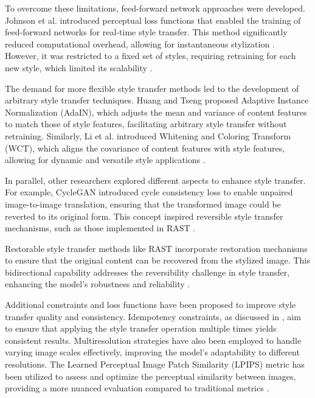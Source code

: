 \documentclass{article}
\begin{document}
To overcome these limitations, feed-forward network approaches were developed. Johnson et al. \cite{Johnson2016} introduced perceptual loss functions that enabled the training of feed-forward networks for real-time style transfer. This method significantly reduced computational overhead, allowing for instantaneous stylization \cite{Johnson2016}. However, it was restricted to a fixed set of styles, requiring retraining for each new style, which limited its scalability \cite{Johnson2016}.

The demand for more flexible style transfer methods led to the development of arbitrary style transfer techniques. Huang and Tseng \cite{Huang2017} proposed Adaptive Instance Normalization (AdaIN), which adjusts the mean and variance of content features to match those of style features, facilitating arbitrary style transfer without retraining. Similarly, Li et al. \cite{Li2017} introduced Whitening and Coloring Transform (WCT), which aligns the covariance of content features with style features, allowing for dynamic and versatile style applications \cite{Huang2017, Li2017}.

In parallel, other researchers explored different aspects to enhance style transfer. For example, CycleGAN \cite{CycleGAN2017} introduced cycle consistency loss to enable unpaired image-to-image translation, ensuring that the transformed image could be reverted to its original form. This concept inspired reversible style transfer mechanisms, such as those implemented in RAST \cite{Ma2023RAST}.

Restorable style transfer methods like RAST \cite{Ma2023RAST} incorporate restoration mechanisms to ensure that the original content can be recovered from the stylized image. This bidirectional capability addresses the reversibility challenge in style transfer, enhancing the model's robustness and reliability \cite{CycleGAN2017, Ma2023RAST}.

Additional constraints and loss functions have been proposed to improve style transfer quality and consistency. Idempotency constraints, as discussed in \cite{SomeOtherPaper}, aim to ensure that applying the style transfer operation multiple times yields consistent results. Multiresolution strategies \cite{Li2018, Fernandez2019} have also been employed to handle varying image scales effectively, improving the model's adaptability to different resolutions. The Learned Perceptual Image Patch Similarity (LPIPS) metric \cite{Zhang2018LPIPS} has been utilized to assess and optimize the perceptual similarity between images, providing a more nuanced evaluation compared to traditional metrics \cite{Wang2019}.
\end{document}
